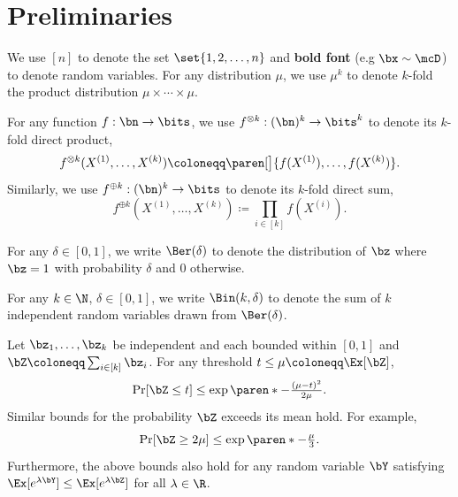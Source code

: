 \section{Preliminaries}

We use $[n]$ to denote the set $\set{1,2,\ldots, n}$ and \textbf{bold font} (e.g $\bx \sim \mcD$) to denote random variables. For any distribution $\mu$, we use $\mu^k$ to denote $k$-fold the product distribution $\mu \times \cdots \times \mu$.

For any function $f:\bn \to \bits$, we use $f^{\otimes k}: (\bn)^k \to \bits^k$ to denote its $k$-fold direct product,
\begin{equation*}
    f^{\otimes k}(X^{(1)}, \ldots, X^{(k)}) \coloneqq \paren[\big]{f(X^{(1)}), \ldots, f(X^{(k)})}.
\end{equation*}
Similarly, we use $f^{\oplus k}: (\bn)^k \to \bits$ to denote its $k$-fold direct sum,
\begin{equation*}
    f^{\oplus k}(X^{(1)}, \ldots, X^{(k)}) \coloneqq \prod_{i \in [k]}f(X^{(i)}).
\end{equation*}


\begin{definition}
    For any $\delta \in [0,1]$, we write $\Ber(\delta)$ to denote the distribution of $\bz$ where $\bz = 1$ with probability $\delta$ and $0$ otherwise.
\end{definition}

\begin{definition}
    For any $k \in \N$, $\delta \in [0,1]$, we write $\Bin(k, \delta)$ to denote the sum of $k$ independent random variables drawn from $\Ber(\delta)$.
\end{definition}

\begin{fact}
    \label{fact:chernoff}
    Let $\bz_1, \ldots, \bz_k$ be independent and each bounded within $[0,1]$ and $\bZ \coloneqq \sum_{i \in [k]}\bz_i$. For any threshold $t \leq \mu \coloneqq \Ex[\bZ]$,
    \begin{equation*}
        \Pr[\bZ \leq t] \leq \exp\paren*{-\tfrac{(\mu - t)^2}{2\mu}}.
    \end{equation*}
    Similar bounds for the probability $\bZ$ exceeds its mean hold. For example,
    \begin{equation*}
        \Pr[\bZ \geq 2\mu] \leq \exp\paren*{-\tfrac{\mu}{3}}.
    \end{equation*}
    Furthermore, the above bounds also hold for any random variable $\bY$ satisfying $\Ex[e^{\lambda \bY}] \leq \Ex[e^{\lambda \bZ}]$ for all $\lambda \in \R$.
\end{fact}





